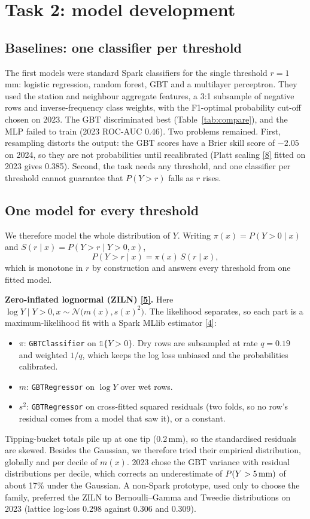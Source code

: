 \documentclass[lang=en,11pt,a4paper,bibend=bibtex]{elegantpaper}
\newcommand{\mm}{\,mm}
\begin{document}
\section{Task 2: model development}\label{sec:model}
\subsection{Baselines: one classifier per threshold}\label{sec:baselines}
The first models were standard Spark classifiers for the single threshold $r=1$\mm: logistic regression, random forest, GBT and a multilayer perceptron. They used the station and neighbour aggregate features, a 3:1 subsample of negative rows and inverse-frequency class weights, with the F1-optimal probability cut-off chosen on 2023. The GBT discriminated best (Table~\ref{tab:compare}), and the MLP failed to train (2023 ROC-AUC 0.46). Two problems remained. First, resampling distorts the output: the GBT scores have a Brier skill score of $-2.05$ on 2024, so they are not probabilities until recalibrated (Platt scaling \hyperref[ref:8]{[8]} fitted on 2023 gives 0.385). Second, the task needs any threshold, and one classifier per threshold cannot guarantee that $P(Y>r)$ falls as $r$ rises.

\subsection{One model for every threshold}\label{sec:ziln}
We therefore model the whole distribution of $Y$. Writing $\pi(x) = P(Y>0\mid x)$ and $S(r\mid x) = P(Y>r \mid Y>0, x)$,
\[
P(Y > r \mid x) = \pi(x)\, S(r \mid x),
\]
which is monotone in $r$ by construction and answers every threshold from one fitted model.

\textbf{Zero-inflated lognormal (ZILN) \hyperref[ref:5]{[5]}.} Here $\log Y \mid Y>0, x \sim \mathcal N\big(m(x), s(x)^2\big)$. The likelihood separates, so each part is a maximum-likelihood fit with a Spark MLlib estimator \hyperref[ref:4]{[4]}:
\begin{itemize}[leftmargin=1.5em,itemsep=3pt]
\item $\pi$: \texttt{GBTClassifier} on $\mathbb 1\{Y>0\}$. Dry rows are subsampled at rate $q=0.19$ and weighted $1/q$, which keeps the log loss unbiased and the probabilities calibrated.
\item $m$: \texttt{GBTRegressor} on $\log Y$ over wet rows.
\item $s^2$: \texttt{GBTRegressor} on cross-fitted squared residuals (two folds, so no row's residual comes from a model that saw it), or a constant.
\end{itemize}
Tipping-bucket totals pile up at one tip (0.2\mm), so the standardised residuals are skewed. Besides the Gaussian, we therefore tried their empirical distribution, globally and per decile of $m(x)$. 2023 chose the GBT variance with residual distributions per decile, which corrects an underestimate of $P(Y>5\text{\mm})$ of about 17\% under the Gaussian. A non-Spark prototype, used only to choose the family, preferred the ZILN to Bernoulli--Gamma and Tweedie distributions on 2023 (lattice log-loss 0.298 against 0.306 and 0.309).
\end{document}
